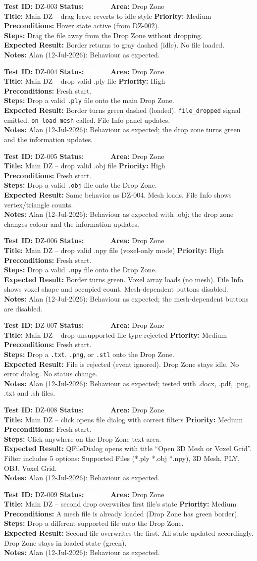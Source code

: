 \documentclass[12pt,a4paper]{article}
\newcommand{\statuspass}{\colorbox{statusgreen}{\textcolor{white}{\textbf{\,PASS\,}}}}
\newcommand{\testcase}[9]{%
  \smallskip
  \noindent\textbf{Test ID:} #1 \hfill \textbf{Status:} #2 \hfill \textbf{Area:} #3 \\
  \textbf{Title:} #4 \hfill \textbf{Priority:} #5 \\[0.3em]
  \textbf{Preconditions:} #6 \\[0.3em]
  \textbf{Steps:} #7 \\[0.3em]
  \textbf{Expected Result:} #8 \\
  \textbf{Notes:} #9
  \smallskip
}
\begin{document}
\testcase{DZ-003}{\statuspass}{Drop Zone}{Main DZ -- drag leave reverts to idle style}{Medium}{Hover state active (from DZ-002).}{Drag the file away from the Drop Zone without dropping.}{Border returns to gray dashed (idle). No file loaded.}{Alan (12-Jul-2026): Behaviour as expected.}


\testcase{DZ-004}{\statuspass}{Drop Zone}{Main DZ -- drop valid .ply file}{High}{Fresh start.}{Drop a valid \texttt{.ply} file onto the main Drop Zone.}{Border turns green dashed (loaded). \texttt{file\_dropped} signal emitted. \texttt{on\_load\_mesh} called. File Info panel updates.}{Alan (12-Jul-2026): Behaviour as expected; the drop zone turns green and the information updates.}


\testcase{DZ-005}{\statuspass}{Drop Zone}{Main DZ -- drop valid .obj file}{High}{Fresh start.}{Drop a valid \texttt{.obj} file onto the Drop Zone.}{Same behavior as DZ-004. Mesh loads. File Info shows vertex/triangle counts.}{Alan (12-Jul-2026): Behaviour as expected with .obj; the drop zone changes colour and the information updates.}


\testcase{DZ-006}{\statuspass}{Drop Zone}{Main DZ -- drop valid .npy file (voxel-only mode)}{High}{Fresh start.}{Drop a valid \texttt{.npy} file onto the Drop Zone.}{Border turns green. Voxel array loads (no mesh). File Info shows voxel shape and occupied count. Mesh-dependent buttons disabled.}{Alan (12-Jul-2026): Behaviour as expected; the mesh-dependent buttons are disabled.}


\testcase{DZ-007}{\statuspass}{Drop Zone}{Main DZ -- drop unsupported file type rejected}{Medium}{Fresh start.}{Drop a \texttt{.txt}, \texttt{.png}, or \texttt{.stl} onto the Drop Zone.}{File is rejected (event ignored). Drop Zone stays idle. No error dialog. No status change.}{Alan (12-Jul-2026): Behaviour as expected; tested with .docx, .pdf, .png, .txt and .sh files.}


\testcase{DZ-008}{\statuspass}{Drop Zone}{Main DZ -- click opens file dialog with correct filters}{Medium}{Fresh start.}{Click anywhere on the Drop Zone text area.}{QFileDialog opens with title ``Open 3D Mesh or Voxel Grid''. Filter includes 5 options: Supported Files (*.ply *.obj *.npy), 3D Mesh, PLY, OBJ, Voxel Grid.}{Alan (12-Jul-2026): Behaviour as expected.}


\testcase{DZ-009}{\statuspass}{Drop Zone}{Main DZ -- second drop overwrites first file's state}{Medium}{A mesh file is already loaded (Drop Zone has green border).}{Drop a different supported file onto the Drop Zone.}{Second file overwrites the first. All state updated accordingly. Drop Zone stays in loaded state (green).}{Alan (12-Jul-2026): Behaviour as expected.}
\end{document}
